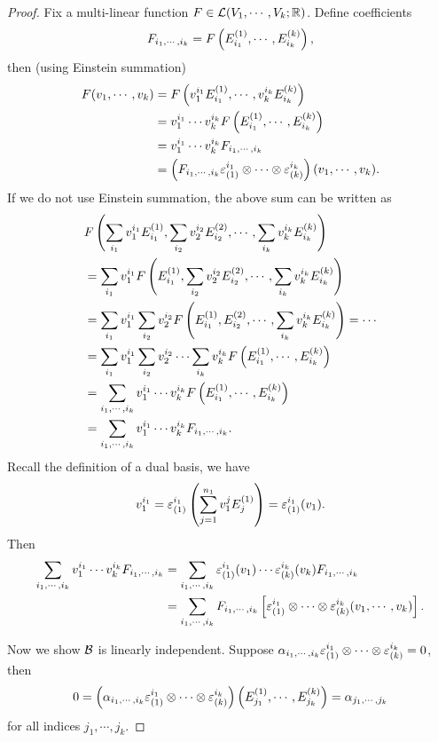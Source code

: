 \begin{proof}
    Fix a multi-linear function $F \in \mathcal{L}(V_1, \cdots, V_k; \mathbb{R})$. 
    Define coefficients 
    $$F_{i_1, \cdots, i_k} = F\left(E_{i_1}^{(1)}, \cdots, E_{i_k}^{(k)} \right), $$ then (using Einstein summation)
    \begin{align*}
    F(v_1, \cdots, v_k) &= F
    \left( v_1^{i_1}E_{i_1}^{(1)}, \cdots, v_k^{i_k}E_{i_k}^{(k)} \right) \\
    &= v_1^{i_1} \cdots v_k^{i_k}F
    \left( E_{i_1}^{(1)}, \cdots, E_{i_k}^{(k)} \right) \\
    &= v_1^{i_1} \cdots v_k^{i_k} F_{i_1, \cdots, i_k} \\
    &= \left(F_{i_1, \cdots, i_k} \varepsilon_{(1)}^{i_1} \otimes \cdots \otimes \varepsilon_{(k)}^{i_k} \right) (v_1, \cdots, v_k). 
    \end{align*}
    If we do not use Einstein summation, the above sum can be written as 
    \begin{align*}
    &F\left(
    \sum_{i_1}v_1^{i_1}E_{i_1}^{(1)}, \sum_{i_2}v_2^{i_2}E_{i_2}^{(2)}, \cdots,
    \sum_{i_k}v_k^{i_k}E_{i_k}^{(k)}
    \right) \\
    &= \sum_{i_1}v_1^{i_1}F\left(
    E_{i_1}^{(1)}, \sum_{i_2}v_2^{i_2}E_{i_2}^{(2)}, \cdots, \sum_{i_k}v_k^{i_k}E_{i_k}^{(k)}
    \right) \\
    &= \sum_{i_1}v_1^{i_1} \sum_{i_2}v_2^{i_2} F\left(
    E_{i_1}^{(1)}, E_{i_2}^{(2)}, \cdots, \sum_{i_k}v_k^{i_k}E_{i_k}^{(k)}
    \right) = \cdots \\
    &= \sum_{i_1}v_1^{i_1} \sum_{i_2}v_2^{i_2} \cdots \sum_{i_k}v_k^{i_k} 
       F\left( E_{i_1}^{(1)}, \cdots, E_{i_k}^{(k)} \right) \\
    &= \sum_{i_1,\cdots,i_k} v_1^{i_1} \cdots v_k^{i_k}
       F\left( E_{i_1}^{(1)}, \cdots, E_{i_k}^{(k)} \right) \\
    &= \sum_{i_1,\cdots,i_k} v_1^{i_1} \cdots v_k^{i_k}F_{i_1,\cdots,i_k}.     
    \end{align*}
    Recall the definition of a dual basis, we have
    $$v_1^{i_1} = \varepsilon_{(1)}^{i_1}\left(
    \sum_{j=1}^{n_1} v_1^j E_{j}^{(1)}
    \right) = \varepsilon_{(1)}^{i_1}(v_1). $$
    Then
    \begin{align*}
    \sum_{i_1,\cdots,i_k} v_1^{i_1} \cdots v_k^{i_k}F_{i_1,\cdots,i_k}
    &= \sum_{i_1,\cdots,i_k} \varepsilon_{(1)}^{i_1}(v_1) \cdots \varepsilon_{(k)}^{i_k}(v_k)
       F_{i_1,\cdots,i_k} \\
    &= \sum_{i_1,\cdots,i_k} F_{i_1,\cdots,i_k}
       \left[\varepsilon_{(1)}^{i_1} \otimes \cdots \otimes \varepsilon_{(k)}^{i_k} (v_1,\cdots,v_k)\right].
    \end{align*}

    
    Now we show $\mathcal{B}$ is linearly independent.
    Suppose $\alpha_{i_1, \cdots, i_k} \varepsilon_{(1)}^{i_1} \otimes \cdots \otimes \varepsilon_{(k)}^{i_k} = 0$, then
    \begin{align*}
    0 = \left(\alpha_{i_1, \cdots, i_k} \varepsilon_{(1)}^{i_1} \otimes \cdots \otimes \varepsilon_{(k)}^{i_k}\right)\left(E_{j_1}^{(1)}, \cdots, E_{j_k}^{(k)}\right)
    = \alpha_{j_1, \cdots, j_k}
    \end{align*}
    for all indices $j_1, \cdots, j_k$.
\end{proof}